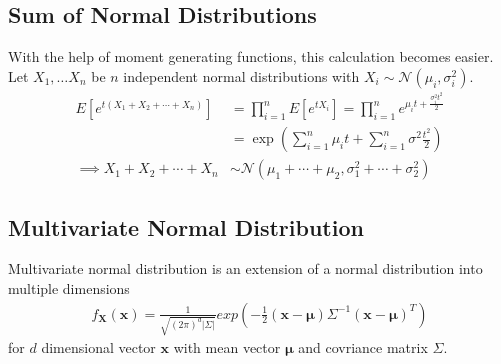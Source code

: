 \documentclass[../../probability-notes.tex]{subfiles}
\begin{document}
    \subsection{Sum of Normal Distributions}
    With the help of moment generating functions, this calculation becomes easier. Let $X_{1}, \ldots X_{n}$ be $n$ independent normal distributions with $X_{i} \sim \mathcal{N}(\mu_{i}, \sigma^{2}_{i})$.
    \begin{align*}
        E[e^{t(X_{1} + X_{2} + \cdots + X_{n})}] &= \prod_{i=1}^{n} E[e^{tX_{i}}] = \prod_{i=1}^{n} e^{\mu_{i} t + \frac{\sigma_{i}^{2} t^{2}}{2}}\\
        &= \exp(\sum_{i=1}^{n} \mu_{i} t+ \sum_{i=1}^{n}\sigma^{2} \frac{t^{2}}{2})\\
        \implies X_{1} + X_{2} + \cdots + X_{n} &\sim \mathcal{N}(\mu_{1} + \cdots + \mu_{2}, \sigma_{1}^{2} + \cdots + \sigma_{2}^{2})
    \end{align*}

    \subsection{Multivariate Normal Distribution}
    Multivariate normal distribution is an extension of a normal distribution into multiple dimensions
    \begin{align*}
        f_{\mathbf{X}}(\bm{x}) = \frac{1}{\sqrt{(2\pi)^{d} \lvert \Sigma \rvert}} exp(-\frac{1}{2}(\mathbf{x} - \bm{\mu})\Sigma^{-1}(\mathbf{x} - \bm{\mu})^{T})
    \end{align*}
    for $d$ dimensional vector $\mathbf{x}$ with mean vector $\bm{\mu}$ and covriance matrix $\Sigma$.
\end{document}
